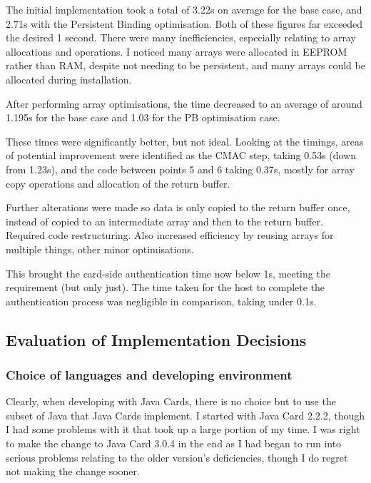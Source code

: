\documentclass[12pt]{article}
\begin{document}

The initial implementation took a total of 3.22s on average for the base case, and 2.71s with the Persistent Binding optimisation. Both of these figures far exceeded the desired 1 second. There were many inefficiencies, especially relating to array allocations and operations. I noticed many arrays were allocated in EEPROM rather than RAM, despite not needing to be persistent, and many arrays could be allocated during installation.

After performing array optimisations, the time decreased to an average of around 1.195s for the base case and 1.03 for the PB optimisation case.

These times were significantly better, but not ideal. Looking at the timings, areas of potential improvement were identified as the CMAC step, taking 0.53s (down from 1.23s), and the code between points 5 and 6 taking 0.37s, mostly for array copy operations and allocation of the return buffer.

Further alterations were made so data is only copied to the return buffer once, instead of copied to an intermediate array and then to the return buffer. Required code restructuring. Also increased efficiency by reusing arrays for multiple things, other minor optimisations.

This brought the card-side authentication time now below 1s, meeting the requirement (but only just). The time taken for the host to complete the authentication process was negligible in comparison, taking under 0.1s.

\subsection{Evaluation of Implementation Decisions}

\subsubsection{Choice of languages and developing environment}
Clearly, when developing with Java Cards, there is no choice but to use the subset of Java that Java Cards implement. I started with Java Card 2.2.2, though I had some problems with it that took up a large portion of my time. I was right to make the change to Java Card 3.0.4 in the end as I had began to run into serious problems relating to the older version's deficiencies, though I do regret not making the change sooner.
\end{document}

